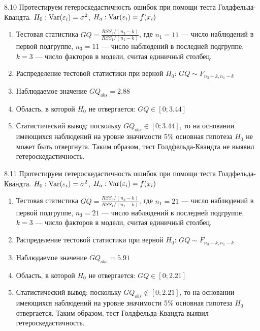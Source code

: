 \protect \hypertarget {soln:8.10}{}
\begin{solution}{{8.10}}
Протестируем гетероскедастичность ошибок при помощи теста Голдфельда-
Квандта. $H_0: \operatorname{Var}(\varepsilon_i)=\sigma^2$, $H_a: \operatorname{Var}(\varepsilon_i)=f(x_i)$

\begin{enumerate}
\item Тестовая статистика $GQ=\frac{RSS_3/(n_3-k)}{RSS_1/(n_1-k)}$, где $n_1=11$ — число наблюдений в первой подгруппе, $n_3=11$ — число наблюдений в
последней подгруппе, $k=3$ — число факторов в модели, считая единичный столбец.
\item Распределение тестовой статистики при верной $H_0$: $GQ\sim F_{n_3-k,n_1-k}$
\item Наблюдаемое значение $GQ_{obs}=2.88$
\item Область, в которой $H_0$ не отвергается: $GQ\in [0;3.44]$
\item Статистический вывод: поскольку $GQ_{obs} \in [0;3.44]$, то на основании имеющихся наблюдений на уровне значимости 5\% основная гипотеза $H_0$ не может быть отвергнута. Таким образом, тест Голдфельда-Квандта не выявил гетероскедастичность.
\end{enumerate}
\end{solution}
\protect \hypertarget {soln:8.11}{}
\begin{solution}{{8.11}}
Протестируем гетероскедастичность ошибок при помощи теста Голдфельда-
Квандта. $H_0: \operatorname{Var}(\varepsilon_i)=\sigma^2$, $H_a: \operatorname{Var}(\varepsilon_i)=f(x_i)$

\begin{enumerate}
\item Тестовая статистика $GQ=\frac{RSS_3/(n_3-k)}{RSS_1/(n_1-k)}$, где $n_1=21$ — число наблюдений в первой подгруппе, $n_3=21$ — число наблюдений в
последней подгруппе, $k=3$ — число факторов в модели, считая единичный столбец.
\item Распределение тестовой статистики при верной $H_0$: $GQ\sim F_{n_3-k,n_1-k}$
\item Наблюдаемое значение $GQ_{obs}=5.91$
\item Область, в которой $H_0$ не отвергается: $GQ\in [0;2.21]$
\item Статистический вывод: поскольку $GQ_{obs} \notin [0;2.21]$, то на основании имеющихся наблюдений на уровне значимости 5\% основная гипотеза $H_0$ отвергается. Таким образом, тест Голдфельда-Квандта выявил гетероскедастичность.
\end{enumerate}
\end{solution}

